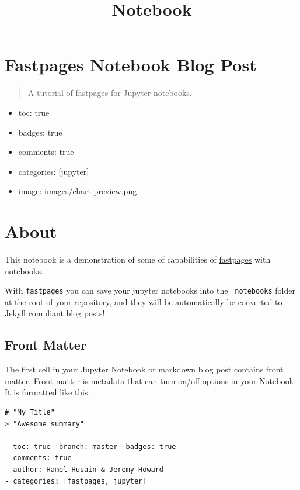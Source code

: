 \documentclass[11pt]{article}
\title{Notebook}
\providecommand{\tightlist}{%
      \setlength{\itemsep}{0pt}\setlength{\parskip}{0pt}}
\begin{document}
    
    \maketitle
    
    

    
    \hypertarget{fastpages-notebook-blog-post}{%
\section{Fastpages Notebook Blog
Post}\label{fastpages-notebook-blog-post}}
\label{sec:01-test}
    \begin{quote}
A tutorial of fastpages for Jupyter notebooks.
\end{quote}

\begin{itemize}
\tightlist
\item
  toc: true
\item
  badges: true
\item
  comments: true
\item
  categories: {[}jupyter{]}
\item
  image: images/chart-preview.png
\end{itemize}

    \hypertarget{about}{%
\section{About}\label{about}}

This notebook is a demonstration of some of capabilities of
\href{https://github.com/fastai/fastpages}{fastpages} with notebooks.

With \texttt{fastpages} you can save your jupyter notebooks into the
\texttt{\_notebooks} folder at the root of your repository, and they
will be automatically be converted to Jekyll compliant blog posts!

    \hypertarget{front-matter}{%
\subsection{Front Matter}\label{front-matter}}

The first cell in your Jupyter Notebook or markdown blog post contains
front matter. Front matter is metadata that can turn on/off options in
your Notebook. It is formatted like this:

\begin{verbatim}
# "My Title"
> "Awesome summary"

- toc: true- branch: master- badges: true
- comments: true
- author: Hamel Husain & Jeremy Howard
- categories: [fastpages, jupyter]
\end{verbatim}
\end{document}

